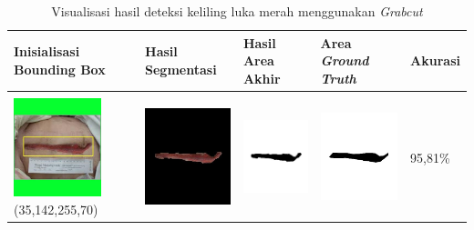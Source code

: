 \begin{table}[H]
	\centering
	\caption{Visualisasi hasil deteksi keliling luka merah menggunakan \emph{Grabcut}}
	\label{tabel_hasil_15}
	\begin{tabular}{|m{1.0in}|m{1.0in}|m{1.0in}|m{1.0in}|m{0.6in}|}
		\hline
		\textbf{Inisialisasi Bounding Box} & \textbf{Hasil Segmentasi} & \textbf{Hasil Area Akhir} & \textbf{Area \emph{Ground Truth}} & \textbf{Akurasi} \\
		\hline
		&  &  & \\
		\includegraphics[width=1.0in]{gambar/hasil_segmentasi/luka_merah/image_35_rect.jpg} {\centering\fontsize{10}{10}\selectfont(35,142,255,70)}&
		\includegraphics[width=1.0in]{gambar/hasil_segmentasi/luka_merah/result_35.jpg}&
		\includegraphics[width=1.0in]{gambar/hasil_segmentasi/luka_merah/mask_r_35.jpg}&
		\includegraphics[width=1.0in]{gambar/hasil_segmentasi/luka_merah/35_r.jpg}&
		95,81\% \\
		\hline


\end{tabular}
\end{table}
